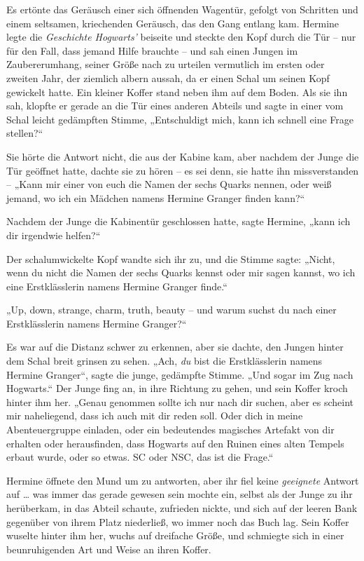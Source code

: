 {Es ertönte das Geräusch einer sich öffnenden Wagentür, gefolgt von Schritten und einem seltsamen, kriechenden Geräusch, das den Gang entlang kam. Hermine legte die \emph{Geschichte Hogwarts'} beiseite und steckte den Kopf durch die Tür -- nur für den Fall, dass jemand Hilfe brauchte -- und sah einen Jungen im Zaubererumhang, seiner Größe nach zu urteilen vermutlich im ersten oder zweiten Jahr, der ziemlich albern aussah, da er einen Schal um seinen Kopf gewickelt hatte. Ein kleiner Koffer stand neben ihm auf dem Boden. Als sie ihn sah, klopfte er gerade an die Tür eines anderen Abteils und sagte in einer vom Schal leicht gedämpften Stimme, „Entschuldigt mich, kann ich schnell eine Frage stellen?“

Sie hörte die Antwort nicht, die aus der Kabine kam, aber nachdem der Junge die Tür geöffnet hatte, dachte sie zu hören -- es sei denn, sie hatte ihn missverstanden -- „Kann mir einer von euch die Namen der sechs Quarks nennen, oder weiß jemand, wo ich ein Mädchen namens Hermine Granger finden kann?“

Nachdem der Junge die Kabinentür geschlossen hatte, sagte Hermine, „kann ich dir irgendwie helfen?“

Der schalumwickelte Kopf wandte sich ihr zu, und die Stimme sagte: „Nicht, wenn du nicht die Namen der sechs Quarks kennst oder mir sagen kannst, wo ich eine Erstklässlerin namens Hermine Granger finde.“

„Up, down, strange, charm, truth, beauty -- und warum suchst du nach einer Erstklässlerin namens Hermine Granger?“

Es war auf die Distanz schwer zu erkennen, aber sie dachte, den Jungen hinter dem Schal breit grinsen zu sehen. „Ach, \emph{du} bist die Erstklässlerin namens Hermine Granger“, sagte die junge, gedämpfte Stimme. „Und sogar im Zug nach Hogwarts.“ Der Junge fing an, in ihre Richtung zu gehen, und sein Koffer kroch hinter ihm her. „Genau genommen sollte ich nur nach dir suchen, aber es scheint mir naheliegend, dass ich auch mit dir reden soll. Oder dich in meine Abenteuergruppe einladen, oder ein bedeutendes magisches Artefakt von dir erhalten oder herausfinden, dass Hogwarts auf den Ruinen eines alten Tempels erbaut wurde, oder so etwas. SC oder NSC, das ist die Frage.“

Hermine öffnete den Mund um zu antworten, aber ihr fiel keine \emph{geeignete} Antwort auf … was immer das gerade gewesen sein mochte ein, selbst als der Junge zu ihr herüberkam, in das Abteil schaute, zufrieden nickte, und sich auf der leeren Bank gegenüber von ihrem Platz niederließ, wo immer noch das Buch lag. Sein Koffer wuselte hinter ihm her, wuchs auf dreifache Größe, und schmiegte sich in einer beunruhigenden Art und Weise an ihren Koffer.

}
